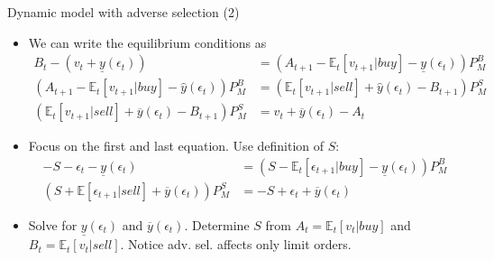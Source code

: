 \documentclass[english,10pt
,aspectratio=169
]{beamer}
\begin{document}
\begin{frame}{Dynamic model with adverse selection (2)}
	\begin{itemize}
		\item We can write the equilibrium conditions as
		\begin{align*}
		B_t-(v_t+\underline{y}(\epsilon_t)) 					& = (A_{t+1}-\mathbb{E}_t[v_{t+1}|buy]-\underline{y}(\epsilon_t) 	)P^B_M \\
		(A_{t+1}-\mathbb{E}_t[v_{t+1}|buy]-\hat{y}(\epsilon_t))P^B_M 			& = (\mathbb{E}_t[v_{t+1}|sell]+\hat{y}(\epsilon_t)-B_{t+1})P^S_M  \\
		(\mathbb{E}_t[v_{t+1}|sell]+\overline{y}(\epsilon_t)-B_{t+1}) P^S_M  	& = v_t+\overline{y}(\epsilon_t)-A_t 
		\end{align*}
		\item Focus on the first and last equation. Use definition of $S$:
		\begin{align*}
		-S-\epsilon_t-\underline{y}(\epsilon_t) 					& = (S-\mathbb{E}_t[\epsilon_{t+1}|buy]-\underline{y}(\epsilon_t) 	)P^B_M \\
		(S+\mathbb{E}[\epsilon_{t+1}|sell]+\overline{y}(\epsilon_t)) P^S_M  	& =-S+\epsilon_t+\overline{y}(\epsilon_t)
		\end{align*}
		\item Solve for $\underline{y}(\epsilon_t)$ and $\overline{y}(\epsilon_t)$. Determine $S$ from $A_t=\mathbb{E}_t[v_t|buy]$ and $B_t= \mathbb{E}_t[v_t|sell]$. Notice adv. sel. affects only limit orders. \hyperlink{parlourmain}{}
	\end{itemize}
\end{frame}
\end{document}
